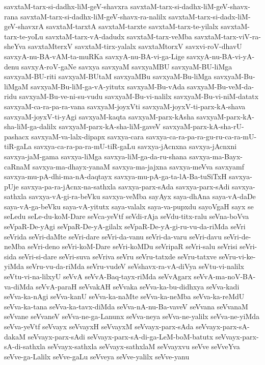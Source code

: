 {savxtaM-tarx-si-dadhx-liM-geV-shavxra
savxtaM-tarx-si-dadhx-liM-geV-shavx-rana
savxtaM-tarx-si-dadhx-liM-geV-shavx-ra-nalilx
savxtaM-tarx-si-dadx-liM-geV-shavxrA
savxtaM-tarxtA
savxtaM-tarxte
savxtaM-tarx-te-yilalx
savxtaM-tarx-te-yoLu
savxtaM-tarx-vA-dadudx
savxtaM-tarx-veMba
savxtaM-tarx-viV-ra-sheYva
savxtaMterxV
savxtaM-tirx-yalalx
savxtaMtorxV
savxvi-roV-dhavU
savxyA-nu-BA-vAM-ta-muRKa
savxyA-nu-BA-vi-ga-Lige
savxyA-nu-BA-vi-yA-denu
savxyA-roV-gaNe
savxya
savxyaM
savxyaMBU
savxyaM-BU-liMga
savxyaM-BU-riti
savxyaM-BUtaM
savxyaMBu
savxyaM-Bu-liMga
savxyaM-Bu-liMgaM
savxyaM-Bu-liM-ga-vA-yitutx
savxyaM-Bu-vAda
savxyaM-Bu-veM-da-ridu
savxyaM-Bu-ve-ni-su-vudu
savxyaM-Bu-vi-nalilx
savxyaM-Bu-vi-niM-datatx
savxyaM-ca-ra-pa-ra-vana
savxyaM-joyxVti
savxyaM-joyxV-ti-parx-kA-shava
savxyaM-joyxV-ti-yAgi
savxyaM-kaqta
savxyaM-parx-kAsha
savxyaM-parx-kA-sha-liM-ga-dalilx
savxyaM-parx-kA-sha-liM-gaveV
savxyaM-parx-kA-sha-rU-pashacx
savxyaM-va-lalx-dipapx
savxya-cara
savxya-ca-ra-pa-ra-gu-ru-ca-ra-mU-tiR-gaLa
savxya-ca-ra-pa-ra-mU-tiR-gaLu
savxya-jAcnxna
savxya-jAcnxni
savxya-jaM-gama
savxya-liMga
savxya-liM-ga-da-ru-shana
savxya-ma-Bayx-caRnaM
savxya-ma-dhayx-yanaM
savxya-ma-jajxna
savxya-meVva
savxyamf
savxya-mu-pA-dhi-ma-nA-daqtayx
savxya-mu-pA-ga-ta-lA-Ba-tuSiTxH
savxya-pUje
savxya-pa-ra-jAcnx-na-sathxla
savxya-parx-sAda
savxya-parx-sAdi
savxya-sathxla
savxya-vA-gi-ra-beVku
savxya-veMba
sayAyx
saya-dhAna
saya-vA-daDe
saya-vA-ga-beVku
saya-vA-yitutx
saya-valalx
saya-va-pupxdu
sayoVgaH
sayx
se
seLedu
seLe-du-koM-Dare
seVca-yeVtf
seVdi-rAja
seVdu-titx-ralu
seVna-boVva
seVpaR-De-yAgi
seVpaR-De-yA-gilalx
seVpaR-De-yA-gi-ru-vu-da-riMda
seVri
seVrida
seVri-daMte
seVri-dare
seVri-da-vanu
seVri-da-varu
seVri-davu
seVri-de-neMba
seVri-deno
seVri-koM-Dare
seVri-koMDu
seVripaR
seVri-salu
seVrisi
seVri-sida
seVri-si-dare
seVri-suva
seVriva
seVru
seVru-tatxde
seVru-tatxve
seVru-vi-ke-yiMda
seVru-vu-da-riMda
seVru-vudeV
seVshavx-ra-vA-diVya
seVtu-vi-nalilx
seVtu-vi-na-lilxyU
seVvA
seVvA-Baq-tayx-riMda
seVvAgarx
seVvA-ma-noV-BA-va-diMda
seVvA-paraH
seVvakAH
seVvaka
seVva-ka-bu-didhxya
seVva-kadi
seVva-ka-nAgi
seVva-kanU
seVva-ka-naMte
seVva-ka-neMba
seVva-ka-reMdU
seVva-ka-tana
seVva-ka-tavx-diMda
seVva-nA-nu-Ba-vaveV
seVvana
seVvanaM
seVvane
seVvaneV
seVva-ne-ga-Lanunx
seVva-neya
seVva-ne-yalilx
seVva-ne-yiMda
seVva-yeVtf
seVvayx
seVvayxH
seVvayxM
seVvayx-parx-sAda
seVvayx-parx-sA-dakaM
seVvayx-parx-sAdi
seVvayx-parx-sA-di-ga-LeM-boM-batutx
seVvayx-parx-sA-di-sathxla
seVvayx-sathxla
seVvayx-sathxlaM
seVvayxvu
seVve
seVveYva
seVve-ga-Lalilx
seVve-gaLu
seVveya
seVve-yalilx
seVve-yanu
}
